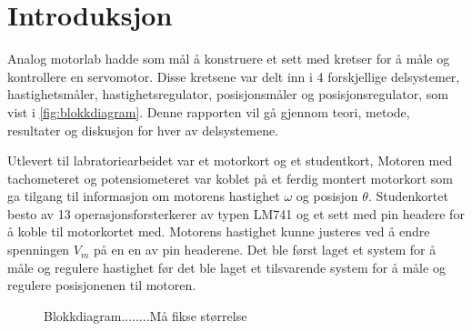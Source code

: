 \section{Introduksjon}\label{sec:intro}

Analog motorlab hadde som mål å konstruere et sett med kretser for å måle og kontrollere en servomotor. Disse kretsene var delt inn i 4 forskjellige delsystemer, hastighetsmåler, hastighetsregulator, posisjonsmåler og posisjonsregulator, som vist i \autoref{fig:blokkdiagram}. Denne rapporten vil gå gjennom teori, metode, resultater og diskusjon for hver av delsystemene.

Utlevert til labratoriearbeidet var et motorkort og et studentkort, Motoren med tachometeret og potensiometeret var koblet på et ferdig montert motorkort som ga tilgang til informasjon om motorens hastighet $\omega$ og posisjon $\theta$. Studenkortet besto av 13 operasjonsforsterkerer av typen LM741\cite{LM741} og et sett med pin headere for å koble til motorkortet med. Motorens hastighet kunne justeres ved å endre spenningen $V_m$ på en en av pin headerene. Det ble først laget et system for å måle og regulere hastighet før det ble laget et tilsvarende system for å måle og regulere posisjonenen til motoren.




\begin{figure}[b]
    \centering
    
    \caption{Blokkdiagram........Må fikse størrelse}
    \label{fig:blokkdiagram}
\end{figure}















